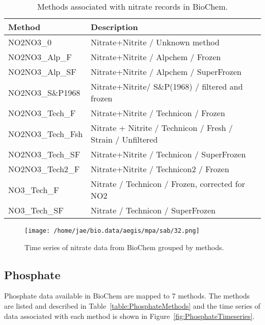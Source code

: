 \documentclass[letterpaper,portrait,11pt]{scrartcl}
\numberwithin{equation}{section}    %
\numberwithin{figure}{section}    %
\numberwithin{table}{section}       %
\begin{document}
\begin{appendices}
\begin{table}[h]
  \caption{Methods associated with nitrate records in BioChem.}
    \label{table:Nmethods}
  \begin{tabular}{ll}
    Method & Description\\
    \hline
    NO2NO3\_0 & Nitrate+Nitrite / Unknown method \\
    NO2NO3\_Alp\_F & Nitrate+Nitrite / Alpchem / Frozen \\
    NO2NO3\_Alp\_SF & Nitrate+Nitrite / Alpchem / SuperFrozen \\
    NO2NO3\_S\&P1968 & Nitrate+Nitrite/ S\&P(1968) / filtered and frozen \\
    NO2NO3\_Tech\_F & Nitrate+Nitrite / Technicon / Frozen \\
    NO2NO3\_Tech\_Fsh & Nitrate + Nitrite / Technicon / Fresh / Strain / Unfiltered \\
    NO2NO3\_Tech\_SF & Nitrate+Nitrite / Technicon / SuperFrozen \\
    NO2NO3\_Tech2\_F & Nitrate+Nitrite / Technicon2 / Frozen \\
    NO3\_Tech\_F & Nitrate / Technicon / Frozen, corrected for NO2 \\
    NO3\_Tech\_SF & Nitrate / Technicon / SuperFrozen\\
  \end{tabular}
\end{table}

\begin{figure}[h]

  \centering
  \texttt{[image: /home/jae/bio.data/aegis/mpa/sab/32.png]}
  \caption{Time series of nitrate data from BioChem grouped by methods.}
    \label{fig:NTimeseries}
\end{figure}

\subsection{Phosphate}

Phosphate  data available in BioChem are mapped to 7 methods. The methods are listed and described in Table~\ref{table:PhosphateMethods} and the time series of data associated with each method is shown in Figure~\ref{fig:PhosphateTimeseries}.


\end{appendices}
\end{document}
